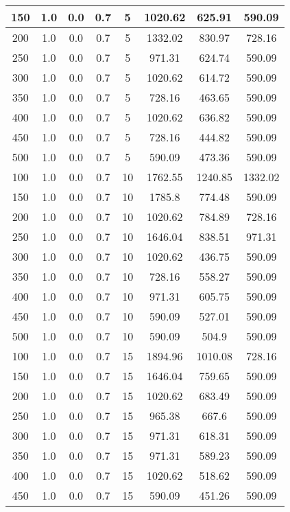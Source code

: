 \documentclass[a4paper, 12pt]{extreport}
\begin{document}
\begin{itemize}
\begin{longtable}{|c|c|c|c|c|c|c|c|}
			150 & 1.0 & 0.0 & 0.7 & 5 & 1020.62 & 625.91 & 590.09 \\\hline
			200 & 1.0 & 0.0 & 0.7 & 5 & 1332.02 & 830.97 & 728.16 \\\hline
			250 & 1.0 & 0.0 & 0.7 & 5 & 971.31 & 624.74 & 590.09 \\\hline
			300 & 1.0 & 0.0 & 0.7 & 5 & 1020.62 & 614.72 & 590.09 \\\hline
			350 & 1.0 & 0.0 & 0.7 & 5 & 728.16 & 463.65 & 590.09 \\\hline
			400 & 1.0 & 0.0 & 0.7 & 5 & 1020.62 & 636.82 & 590.09 \\\hline
			450 & 1.0 & 0.0 & 0.7 & 5 & 728.16 & 444.82 & 590.09 \\\hline
			500 & 1.0 & 0.0 & 0.7 & 5 & 590.09 & 473.36 & 590.09 \\\hline
			100 & 1.0 & 0.0 & 0.7 & 10 & 1762.55 & 1240.85 & 1332.02 \\\hline
			150 & 1.0 & 0.0 & 0.7 & 10 & 1785.8 & 774.48 & 590.09 \\\hline
			200 & 1.0 & 0.0 & 0.7 & 10 & 1020.62 & 784.89 & 728.16 \\\hline
			250 & 1.0 & 0.0 & 0.7 & 10 & 1646.04 & 838.51 & 971.31 \\\hline
			300 & 1.0 & 0.0 & 0.7 & 10 & 1020.62 & 436.75 & 590.09 \\\hline
			350 & 1.0 & 0.0 & 0.7 & 10 & 728.16 & 558.27 & 590.09 \\\hline
			400 & 1.0 & 0.0 & 0.7 & 10 & 971.31 & 605.75 & 590.09 \\\hline
			450 & 1.0 & 0.0 & 0.7 & 10 & 590.09 & 527.01 & 590.09 \\\hline
			500 & 1.0 & 0.0 & 0.7 & 10 & 590.09 & 504.9 & 590.09 \\\hline
			100 & 1.0 & 0.0 & 0.7 & 15 & 1894.96 & 1010.08 & 728.16 \\\hline
			150 & 1.0 & 0.0 & 0.7 & 15 & 1646.04 & 759.65 & 590.09 \\\hline
			200 & 1.0 & 0.0 & 0.7 & 15 & 1020.62 & 683.49 & 590.09 \\\hline
			250 & 1.0 & 0.0 & 0.7 & 15 & 965.38 & 667.6 & 590.09 \\\hline
			300 & 1.0 & 0.0 & 0.7 & 15 & 971.31 & 618.31 & 590.09 \\\hline
			350 & 1.0 & 0.0 & 0.7 & 15 & 971.31 & 589.23 & 590.09 \\\hline
			400 & 1.0 & 0.0 & 0.7 & 15 & 1020.62 & 518.62 & 590.09 \\\hline
			450 & 1.0 & 0.0 & 0.7 & 15 & 590.09 & 451.26 & 590.09 \\\hline

\end{longtable}
\end{itemize}
\end{document}
